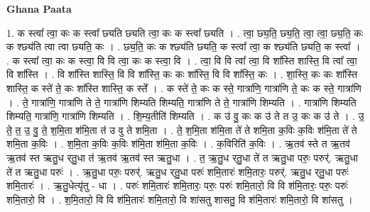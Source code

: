 \documentclass[17pt]{extarticle}
\begin{document}
\textbf{Ghana Paata } \newline

1. क स्त्वा᳚ त्वा॒ कः क स्त्वा᳚ छ्यति छ्यति त्वा॒ कः क स्त्वा᳚ छ्यति । . त्वा॒ छ्य॒ति॒ छ्य॒ति॒ त्वा॒ त्वा॒ छ्य॒ति॒ कः क श्छ्य॑ति त्वा त्वा छ्यति॒ कः । . छ्य॒ति॒ कः क श्छ्य॑ति छ्यति॒ क स्त्वा᳚ त्वा॒ क श्छ्य॑ति छ्यति॒ क स्त्वा᳚ । . क स्त्वा᳚ त्वा॒ कः क स्त्वा॒ वि वि त्वा॒ कः क स्त्वा॒ वि । . त्वा॒ वि वि त्वा᳚ त्वा॒ वि शा᳚स्ति शास्ति॒ वि त्वा᳚ त्वा॒ वि शा᳚स्ति । . वि शा᳚स्ति शास्ति॒ वि वि शा᳚स्ति॒ कः कः शा᳚स्ति॒ वि वि शा᳚स्ति॒ कः । . शा॒स्ति॒ कः कः शा᳚स्ति शास्ति॒ क स्ते॑ ते॒ कः शा᳚स्ति शास्ति॒ क स्ते᳚ । . क स्ते॑ ते॒ कः क स्ते॒ गात्रा॑णि॒ गात्रा॑णि ते॒ कः क स्ते॒ गात्रा॑णि । . ते॒ गात्रा॑णि॒ गात्रा॑णि ते ते॒ गात्रा॑णि शिम्यति शिम्यति॒ गात्रा॑णि ते ते॒ गात्रा॑णि शिम्यति । . गात्रा॑णि शिम्यति शिम्यति॒ गात्रा॑णि॒ गात्रा॑णि शिम्यति । . शि॒म्य॒तीति॑ शिम्यति । . क उ॑ वु॒ कः क उ॑ ते त उ॒ कः क उ॑ ते । . उ॒ ते॒ त॒ उ॒ वु॒ ते॒ श॒मि॒ता श॑मि॒ता त॑ उ वु ते शमि॒ता । . ते॒ श॒मि॒ता श॑मि॒ता ते॑ ते शमि॒ता क॒विः क॒विः श॑मि॒ता ते॑ ते शमि॒ता क॒विः । . श॒मि॒ता क॒विः क॒विः श॑मि॒ता श॑मि॒ता क॒विः । . क॒विरिति॑ क॒विः । . ऋ॒तव॑ स्ते त ऋ॒तव॑ ऋ॒तव॑ स्त ऋतु॒ध र्‌तु॒धा त॑ ऋ॒तव॑ ऋ॒तव॑ स्त ऋतु॒धा । . त॒ ऋ॒तु॒ध र्‌तु॒धा ते॑ त ऋतु॒धा परुः॒ परुर्॑. ऋतु॒धा ते॑ त ऋतु॒धा परुः॑ । . ऋ॒तु॒धा परुः॒ परुर्॑. ऋतु॒ध र्‌तु॒धा परुः॑ शमि॒तारः॑ शमि॒तारः॒ परुर्॑. ऋतु॒ध र्‌तु॒धा परुः॑ शमि॒तारः॑ । . ऋ॒तु॒धेत्यृ॑तु - धा । . परुः॑ शमि॒तारः॑ शमि॒तारः॒ परुः॒ परुः॑ शमि॒तारो॒ वि वि श॑मि॒तारः॒ परुः॒ परुः॑ शमि॒तारो॒ वि । . श॒मि॒तारो॒ वि वि श॑मि॒तारः॑ शमि॒तारो॒ वि शा॑सतु शासतु॒ वि श॑मि॒तारः॑ शमि॒तारो॒ वि शा॑सतु । \newline
\end{document}
